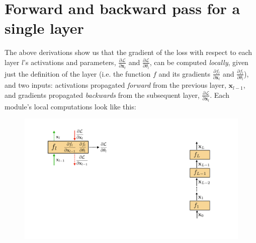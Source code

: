\section{Forward and backward pass for a single layer}
The above derivations show us that the gradient of the loss with respect to each layer $l$'s activations and parameters, $\frac{\partial \mathcal{L}}{\partial \mathbf{x}_{l}}$ and $\frac{\partial \mathcal{L}}{\partial \theta_l}$, can be computed \emph{locally}, given just the definition of the layer (i.e. the function $f$ and its gradients $\frac{\partial f_l}{\partial \mathbf{x}_l}$ and $\frac{\partial f_l}{\partial \theta_l}$), and two inputs: activations propagated \emph{forward} from the previous layer, $\mathbf{x}_{l-1}$, and gradients propagated \emph{backwards} from the subsequent layer, $\frac{\partial \mathcal{L}}{\partial \mathbf{x}_{l}}$. Each module's local computations look like this:
\begin{figure}[h]
    \centering
    \includegraphics[width=0.5\linewidth]{./figures/backpropagation/backprop_mod_block.pdf}
    \label{fig:backprop_mod_block}
\end{figure}


